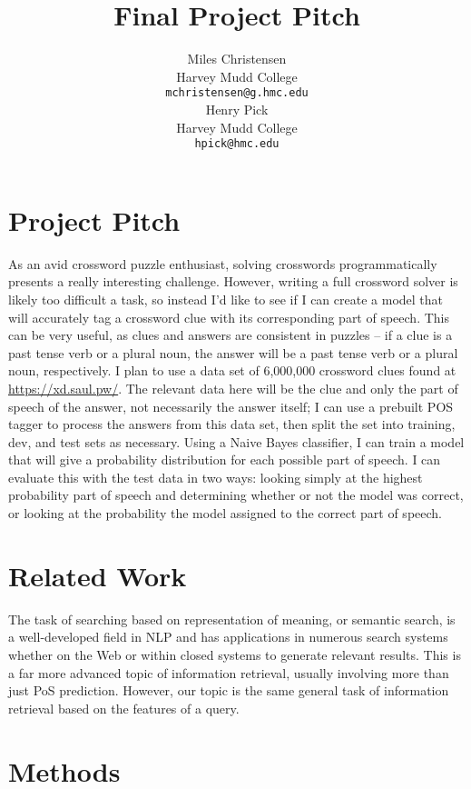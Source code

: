 \documentclass[11pt]{article}
\title{Final Project Pitch}
\author{Miles Christensen \\
  Harvey Mudd College \\
  \texttt{mchristensen@g.hmc.edu} \\\And
  Henry Pick\\
  Harvey Mudd College\\
  \texttt{hpick@hmc.edu}}
\begin{document}
\maketitle

\section{Project Pitch}
As an avid crossword puzzle enthusiast, solving crosswords programmatically presents a really interesting challenge. However, writing a full crossword solver is likely too difficult a task, so instead I'd like to see if I can create a model that will accurately tag a crossword clue with its corresponding part of speech. This can be very useful, as clues and answers are consistent in puzzles -- if a clue is a past tense verb or a plural noun, the answer will be a past tense verb or a plural noun, respectively. I plan to use a data set of 6,000,000 crossword clues found at \url{https://xd.saul.pw/}. The relevant data here will be the clue and only the part of speech of the answer, not necessarily the answer itself; I can use a prebuilt POS tagger to process the answers from this data set, then split the set into training, dev, and test sets as necessary. Using a Naive Bayes classifier, I can train a model that will give a probability distribution for each possible part of speech. I can evaluate this with the test data in two ways: looking simply at the highest probability part of speech and determining whether or not the model was correct, or looking at the probability the model assigned to the correct part of speech.

\section{Related Work}

The task of searching based on representation of meaning, or semantic search, is a well-developed field in NLP and has applications in numerous search systems whether on the Web or within closed systems to generate relevant results. This is a far more advanced topic of information retrieval, usually involving more than just PoS prediction. However, our topic is the same general task of information retrieval based on the features of a query. 

\section{Methods}
\end{document}
